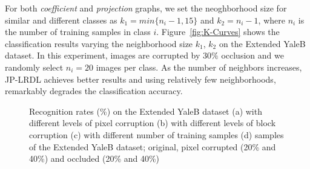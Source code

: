 \documentclass[journal]{IEEEtran}
\begin{document}
For both \textit{coefficient} and \textit{projection} graphs, we set the neoghborhood size for similar and different classes as $k_1 = min\{n_{i}-1,15\}$ and $k_2=n_i-1$, where $n_i$ is the number of training samples in class $i$. Figure~\ref{fig:K-Curves} shows the classification results varying the neighborhood size $k_1$, $k_2$ on the Extended YaleB dataset. In this experiment, images are corrupted by $30\%$ occlusion and we randomly select $n_i = 20$ images per class. As the number of neighbors increases, JP-LRDL achieves better results and using relatively few neighborhoods, remarkably degrades the classification accuracy.
\begin{figure}[t]
\centering
{}  
\hspace{2pt}
\vspace{0.2em}
\caption{Recognition rates (\%) on the Extended YaleB dataset (a) with different levels of pixel corruption (b) with different levels of block corruption (c) with different number of training samples (d) samples of the Extended YaleB dataset; original, pixel corrupted (20\% and 40\%) and occluded (20\% and 40\%)}
\vspace{-1.5em}
\end{figure} 
\end{document}
